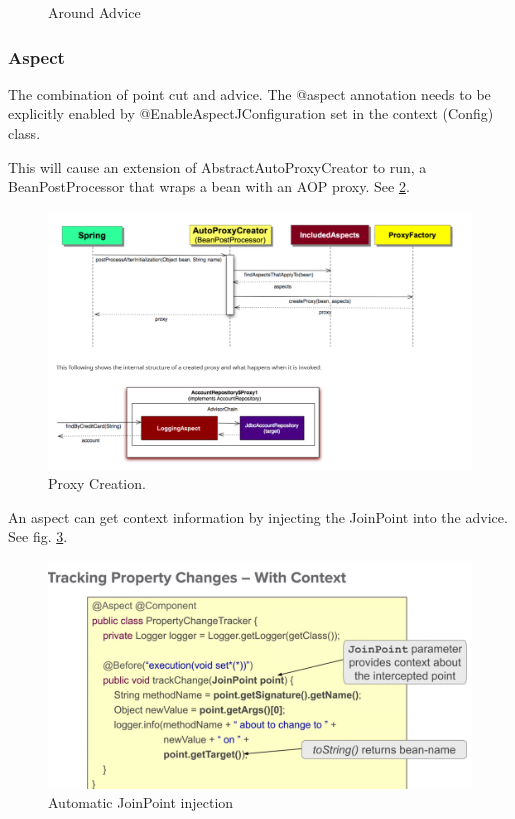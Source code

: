 \documentclass{scrartcl}
\begin{document}
\begin{itemize}
\begin{figure}
        \caption{Around Advice}
        \label{fig:around-advice}
    \end{figure}

\end{itemize}

\subsubsection{Aspect}

The combination of point cut and advice. The @aspect annotation needs to be explicitly enabled by @EnableAspectJConfiguration set in the context (Config) class.

This will cause an extension of AbstractAutoProxyCreator to run, a BeanPostProcessor that wraps a bean with an AOP proxy. See \ref{fig:autoproxycreator}.

\begin{figure}
    \centering
    \includegraphics[width=1\linewidth]{autoproxycreator}
    \caption{Proxy Creation.}
    \label{fig:autoproxycreator}
\end{figure}

An aspect can get context information by injecting the JoinPoint into the advice. See fig. \ref{fig:AOP-join-point}.

\begin{figure}
    \centering
    \includegraphics[width=1\linewidth]{AOP-join-point}
    \caption{Automatic JoinPoint injection}
    \label{fig:AOP-join-point}
\end{figure}
\end{document}
